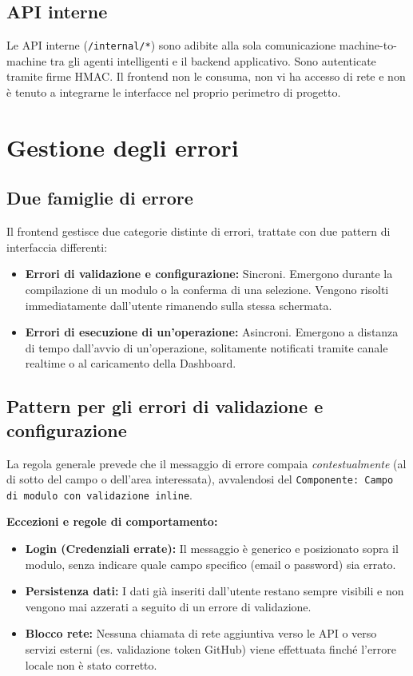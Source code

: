 \documentclass[11pt,a4paper]{article}
\begin{document}
\subsection{API interne}

Le API interne (\texttt{/internal/*}) sono adibite alla sola comunicazione machine-to-machine tra gli agenti intelligenti e il backend applicativo. Sono autenticate tramite firme HMAC. Il frontend non le consuma, non vi ha accesso di rete e non è tenuto a integrarne le interfacce nel proprio perimetro di progetto.

\section{Gestione degli errori}
\label{sec:fe-errori}

\subsection{Due famiglie di errore}

Il frontend gestisce due categorie distinte di errori, trattate con due pattern di interfaccia differenti:

\begin{itemize}
    \item \textbf{Errori di validazione e configurazione:} Sincroni. Emergono durante la compilazione di un modulo o la conferma di una selezione. Vengono risolti immediatamente dall'utente rimanendo sulla stessa schermata.
    \item \textbf{Errori di esecuzione di un'operazione:} Asincroni. Emergono a distanza di tempo dall'avvio di un'operazione, solitamente notificati tramite canale realtime o al caricamento della Dashboard.
\end{itemize}

\subsection{Pattern per gli errori di validazione e configurazione}

La regola generale prevede che il messaggio di errore compaia \emph{contestualmente} (al di sotto del campo o dell'area interessata), avvalendosi del \texttt{Componente: Campo di modulo con validazione inline}.

\textbf{Eccezioni e regole di comportamento:}
\begin{itemize}
    \item \textbf{Login (Credenziali errate):} Il messaggio è generico e posizionato sopra il modulo, senza indicare quale campo specifico (email o password) sia errato.
    \item \textbf{Persistenza dati:} I dati già inseriti dall'utente restano sempre visibili e non vengono mai azzerati a seguito di un errore di validazione.
    \item \textbf{Blocco rete:} Nessuna chiamata di rete aggiuntiva verso le API o verso servizi esterni (es. validazione token GitHub) viene effettuata finché l'errore locale non è stato corretto.
\end{itemize}
\end{document}

